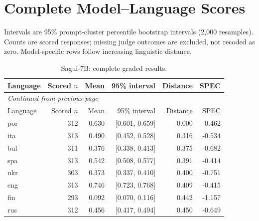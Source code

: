 \section{Complete Model--Language Scores}

Intervals are 95\% prompt-cluster percentile bootstrap intervals (2,000 resamples). Counts are scored responses; missing judge outcomes are excluded, not recoded as zero. Model-specific rows follow increasing linguistic distance.

\begingroup\footnotesize\setlength{\tabcolsep}{3pt}\renewcommand{\arraystretch}{1.12}

\begin{longtable}{lrrrrr}

\caption{Sagui-7B: complete graded results.}\label{tab:detail-sagui_7b}\\

\toprule

Language & Scored $n$ & Mean & 95\% interval & Distance & SPEC\\\midrule

\endfirsthead

\multicolumn{6}{l}{\textit{Continued from previous page}}\\

\toprule

Language & Scored $n$ & Mean & 95\% interval & Distance & SPEC\\\midrule

\endhead

\bottomrule\endfoot

por & 312 & 0.630 & [0.601, 0.659] & 0.000 & 0.462\\

ita & 313 & 0.490 & [0.452, 0.528] & 0.316 & -0.534\\

bul & 311 & 0.376 & [0.338, 0.413] & 0.375 & -0.682\\

spa & 313 & 0.542 & [0.508, 0.577] & 0.391 & -0.414\\

ukr & 303 & 0.373 & [0.337, 0.410] & 0.400 & -0.751\\

eng & 313 & 0.746 & [0.723, 0.768] & 0.409 & -0.415\\

fin & 293 & 0.092 & [0.070, 0.116] & 0.442 & -1.157\\

rus & 312 & 0.456 & [0.417, 0.494] & 0.450 & -0.649\\


\end{longtable}
